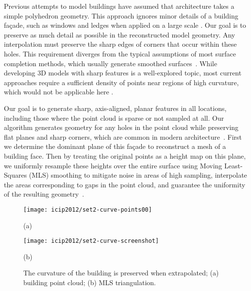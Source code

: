 \documentclass[12pt,onecolumn,oneside]{book}
\begin{document}
Previous attempts to model buildings have assumed that architecture takes a simple polyhedron geometry. This approach ignores minor details of a building fa\c{c}ade, such as windows and ledges when applied on a large scale \cite{Chauve10, Chen07}.  Our goal is to preserve as much detail as possible in the reconstructed model geometry.  Any interpolation must preserve the sharp edges of corners that occur within these holes.  This requirement diverges from the typical assumptions of most surface completion methods, which usually generate smoothed surfaces~\cite{Poisson, Kawai11}.  While developing 3D models with sharp features is a well-explored topic, most current approaches require a sufficient density of points near regions of high curvature, which would not be applicable here \cite{Bernardini04, Mhatre06}.  

Our goal is to generate sharp, axis-aligned, planar features in all locations, including those where the point cloud is sparse or not sampled at all.  Our algorithm generates geometry for any holes in the point cloud while preserving flat planes and sharp corners, which are common in modern architecture~\cite{Turner12outdoor}.  First we determine the dominant plane of this fa\c{c}ade to reconstruct a mesh of a building face.  Then by treating the original points as a height map on this plane, we uniformly resample these heights over the entire surface using Moving Least-Squares (MLS) smoothing to mitigate noise in areas of high sampling, interpolate the areas corresponding to gaps in the point cloud, and guarantee the uniformity of the resulting geometry~\cite{Nealen04}.

\begin{figure}[t]

\begin{minipage}[b]{0.5\linewidth}
  \centering
  \centerline{\texttt{[image: icip2012/set2-curve-points00]}}
  \centerline{(a)}\medskip
\end{minipage}
\hfill
\begin{minipage}[b]{0.5\linewidth}
  \centering
  \centerline{\texttt{[image: icip2012/set2-curve-screenshot]}}
  \centerline{(b)}\medskip
\end{minipage}
%
\caption[Surface reconstruction of building fa\c{c}ade.]{The curvature of the building is preserved when extrapolated; (a) building point cloud; (b) MLS triangulation.}
\label{fig:extrapolate}
%
\end{figure}
\end{document}
